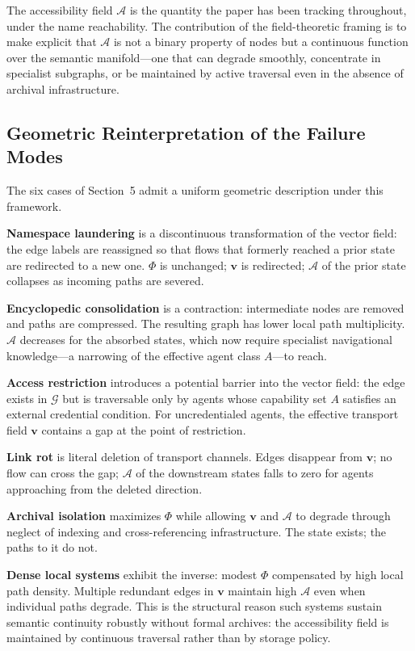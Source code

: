 \documentclass[12pt]{article}
\newcommand{\sG}{\mathcal{G}}
\begin{document}
The accessibility field $\mathcal{A}$ is the quantity the paper has been
tracking throughout, under the name reachability.
The contribution of the field-theoretic framing is to make explicit that
$\mathcal{A}$ is not a binary property of nodes but a continuous function
over the semantic manifold---one that can degrade smoothly, concentrate
in specialist subgraphs, or be maintained by active traversal even in
the absence of archival infrastructure.

\subsection{Geometric Reinterpretation of the Failure Modes}

The six cases of Section~5 admit a uniform geometric description under
this framework.

\textbf{Namespace laundering} is a discontinuous transformation of the
vector field: the edge labels are reassigned so that flows that formerly
reached a prior state are redirected to a new one.
$\Phi$ is unchanged; $\mathbf{v}$ is redirected; $\mathcal{A}$ of the
prior state collapses as incoming paths are severed.

\textbf{Encyclopedic consolidation} is a contraction: intermediate nodes
are removed and paths are compressed.
The resulting graph has lower local path multiplicity.
$\mathcal{A}$ decreases for the absorbed states, which now require
specialist navigational knowledge---a narrowing of the effective agent
class $A$---to reach.

\textbf{Access restriction} introduces a potential barrier into the
vector field: the edge exists in $\sG$ but is traversable only by
agents whose capability set $A$ satisfies an external credential condition.
For uncredentialed agents, the effective transport field $\mathbf{v}$
contains a gap at the point of restriction.

\textbf{Link rot} is literal deletion of transport channels.
Edges disappear from $\mathbf{v}$; no flow can cross the gap;
$\mathcal{A}$ of the downstream states falls to zero for agents
approaching from the deleted direction.

\textbf{Archival isolation} maximizes $\Phi$ while allowing $\mathbf{v}$
and $\mathcal{A}$ to degrade through neglect of indexing and
cross-referencing infrastructure.
The state exists; the paths to it do not.

\textbf{Dense local systems} exhibit the inverse: modest $\Phi$
compensated by high local path density.
Multiple redundant edges in $\mathbf{v}$ maintain high $\mathcal{A}$
even when individual paths degrade.
This is the structural reason such systems sustain semantic continuity
robustly without formal archives: the accessibility field is maintained
by continuous traversal rather than by storage policy.
\end{document}
